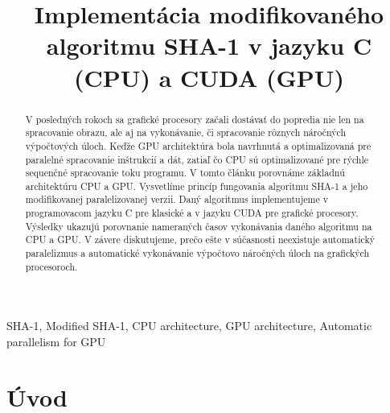 \documentclass[conference]{IEEEtran}
\begin{document}
%
\title{Implementácia modifikovaného algoritmu SHA-1 v jazyku C (CPU) a CUDA (GPU)}

\author{
}


\maketitle

\begin{abstract}
V posledných rokoch sa grafické procesory začali dostávať do popredia nie len na spracovanie obrazu, ale aj na vykonávanie, či spracovanie rôznych náročných výpočtových úloch. Keďže GPU architektúra bola navrhnutá a optimalizovaná pre paralelné spracovanie inštrukcií a dát, zatiaľ čo CPU sú optimalizované pre rýchle sequenčné spracovanie toku programu. V tomto článku porovnáme základnú architektúru CPU a GPU. Vysvetlíme princíp fungovania algoritmu SHA-1 a jeho modifikovanej paralelizovanej verzii. Daný algoritmus implementujeme v programovacom jazyku C pre klasické a v jazyku CUDA pre grafické procesory. Výsledky ukazujú porovnanie nameraných časov vykonávania daného algoritmu na CPU a GPU. V závere diskutujeme, prečo ešte v súčasnosti neexistuje automatický paralelizmus a automatické vykonávanie výpočtovo náročných úloch na grafických procesoroch.
\end{abstract}

\begin{IEEEkeywords}
SHA-1, Modified SHA-1, CPU architecture, GPU architecture, Automatic parallelism for GPU 
\end{IEEEkeywords}

\IEEEpeerreviewmaketitle

\section{Úvod}
\end{document}
